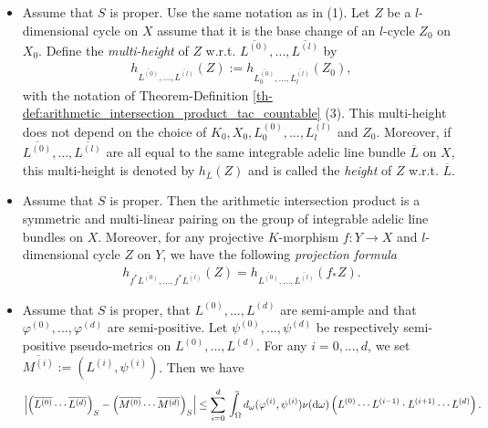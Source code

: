 \documentclass [11pt,reqno]{amsart}
\newcommand{\1}{\mathmybb{1}}
\def\diff{\mathrm{d}}
\def\upint{\mathchoice%
    {\mkern13mu\overline{\vphantom{\intop}\mkern7mu}\mkern-20mu}%
    {\mkern7mu\overline{\vphantom{\intop}\mkern7mu}\mkern-14mu}%
    {\mkern7mu\overline{\vphantom{\intop}\mkern7mu}\mkern-14mu}%
    {\mkern7mu\overline{\vphantom{\intop}\mkern7mu}\mkern-14mu}%
  \int}
\begin{document}
\begin{theorem-definition}
\begin{itemize}
	\item[(3)] Assume that $S$ is proper. Use the same notation as in (1). Let $Z$ be a $l$-dimensional cycle on $X$ assume that it is the base change of an $l$-cycle $Z_{0}$ on $X_{0}$. Define the \emph{multi-height} of $Z$ w.r.t. $\overline{L^{(0)}},...,\overline{L^{(l)}}$ by 
	\begin{align*}
	h_{\overline{L^{(0)}},...,\overline{L^{(l)}}}(Z) := h_{\overline{L_{0}^{(0)}},...,\overline{L_{l}^{(l)}}}(Z_{0}),
	\end{align*}
	with the notation of Theorem-Definition \ref{th-def:arithmetic_intersection_product_tac_countable} (3). This multi-height does not depend on the choice of $K_{0},X_{0},L_{0}^{(0)},...,L_{l}^{(l)}$ and $Z_{0}$. Moreover, if $\overline{L^{(0)}},...,\overline{L^{(l)}}$ are all equal to the same integrable adelic line bundle $\overline{L}$ on $X$, this multi-height is denoted by $h_{\overline{L}}(Z)$ and is called the \emph{height} of $Z$ w.r.t. $\overline{L}$.
	\item[(4)] Assume that $S$ is proper. Then the arithmetic intersection product is a symmetric and multi-linear pairing on the group of integrable adelic line bundles on $X$. Moreover, for any projective $K$-morphism $f:Y\to X$ and $l$-dimensional cycle $Z$ on $Y$, we have the following \emph{projection formula}
	\begin{align*}
	h_{f^{\ast}\overline{L^{(0)}},...,f^{\ast}\overline{L^{(l)}}}(Z) = h_{\overline{L^{(0)}},...,\overline{L^{(l)}}}(f_{\ast}Z).
	\end{align*}
	\item[(5)] Assume that $S$ is proper, that $L^{(0)},...,L^{(d)}$ are semi-ample and that $\varphi^{(0)},...,\varphi^{(d)}$ are semi-positive. Let $\psi^{(0)},...,\psi^{(d)}$ be respectively semi-positive pseudo-metrics on $L^{(0)},...,L^{(d)}$. For any $i=0,...,d$, we set $\overline{M^{(i)}}:=(L^{(i)},\psi^{(i)})$. Then we have
	\begin{align*}
	\left|\left(\overline{L^{(0)}}\cdots\overline{L^{(d)}}\right)_{S} - \left(\overline{M^{(0)}}\cdots\overline{M^{(d)}}\right)_{S}\right| \leq \displaystyle\sum_{i=0}^{d} \upint_{\Omega}d_{\omega}(\varphi^{(i)},\psi^{(i)})\nu(\diff\omega)\left(L^{(0)}\cdots L^{(i-1)}\cdot L^{(i+1)}\cdots L^{(d)}\right).
	\end{align*}
\end{itemize} 
\end{theorem-definition}
\end{document}
